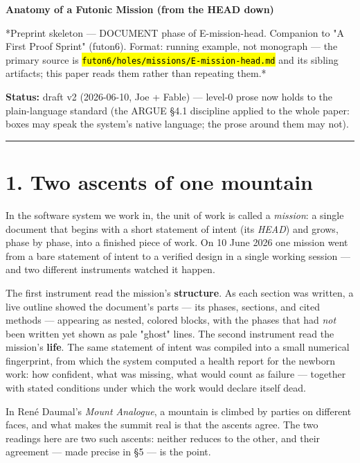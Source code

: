 \documentclass[11pt,oneside]{article}
\newcommand{\scopehl}[1]{\texttt{\hl{#1}}}
\begin{document}
\begin{center}{\LARGE\bfseries Anatomy of a Futonic Mission (from the HEAD down)}\end{center}\medskip

*Preprint skeleton --- DOCUMENT phase of E-mission-head. Companion to "A First
Proof Sprint" (futon6). Format: running example, not monograph --- the primary
source is \scopehl{futon6/holes/missions/E-mission-head.md} and its sibling artifacts;
this paper reads them rather than repeating them.*

\textbf{Status:} draft v2 (2026-06-10, Joe + Fable) --- level-0 prose now holds to the
plain-language standard (the ARGUE \S{}4.1 discipline applied to the whole paper:
boxes may speak the system's native language; the prose around them may not).

\medskip\hrule\medskip

\section*{1. Two ascents of one mountain}

In the software system we work in, the unit of work is called a \emph{mission}: a
single document that begins with a short statement of intent (its \emph{HEAD}) and
grows, phase by phase, into a finished piece of work. On 10 June 2026 one
mission went from a bare statement of intent to a verified design in a single
working session --- and two different instruments watched it happen.

The first instrument read the mission's \textbf{structure}. As each section was
written, a live outline showed the document's parts --- its phases, sections,
and cited methods --- appearing as nested, colored blocks, with the phases that
had \emph{not} been written yet shown as pale "ghost" lines. The second instrument
read the mission's \textbf{life}. The same statement of intent was compiled into a
small numerical fingerprint, from which the system computed a health report
for the newborn work: how confident, what was missing, what would count as
failure --- together with stated conditions under which the work would declare
itself dead.

In René Daumal's \emph{Mount Analogue}, a mountain is climbed by parties on
different faces, and what makes the summit real is that the ascents agree.
The two readings here are two such ascents: neither reduces to the other, and
their agreement --- made precise in \S{}5 --- is the point.
\end{document}
